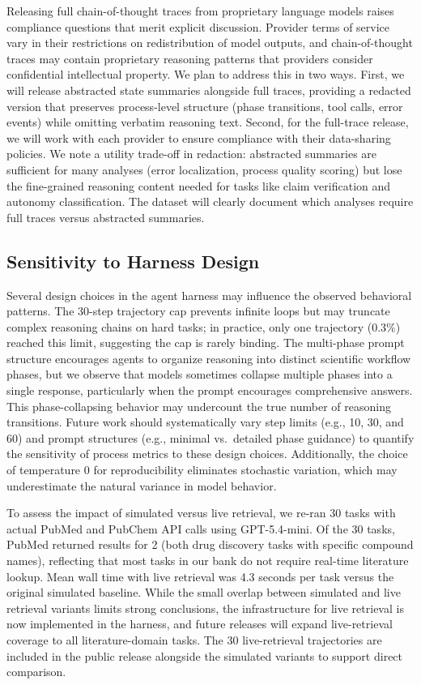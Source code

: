 \documentclass{article}
\begin{document}
Releasing full chain-of-thought traces from proprietary language models raises compliance questions that merit explicit discussion. Provider terms of service vary in their restrictions on redistribution of model outputs, and chain-of-thought traces may contain proprietary reasoning patterns that providers consider confidential intellectual property. We plan to address this in two ways. First, we will release abstracted state summaries alongside full traces, providing a redacted version that preserves process-level structure (phase transitions, tool calls, error events) while omitting verbatim reasoning text. Second, for the full-trace release, we will work with each provider to ensure compliance with their data-sharing policies. We note a utility trade-off in redaction: abstracted summaries are sufficient for many analyses (error localization, process quality scoring) but lose the fine-grained reasoning content needed for tasks like claim verification and autonomy classification. The dataset will clearly document which analyses require full traces versus abstracted summaries.

\subsection{Sensitivity to Harness Design}

Several design choices in the agent harness may influence the observed behavioral patterns. The 30-step trajectory cap prevents infinite loops but may truncate complex reasoning chains on hard tasks; in practice, only one trajectory (0.3\%) reached this limit, suggesting the cap is rarely binding. The multi-phase prompt structure encourages agents to organize reasoning into distinct scientific workflow phases, but we observe that models sometimes collapse multiple phases into a single response, particularly when the prompt encourages comprehensive answers. This phase-collapsing behavior may undercount the true number of reasoning transitions. Future work should systematically vary step limits (e.g., 10, 30, and 60) and prompt structures (e.g., minimal vs.\ detailed phase guidance) to quantify the sensitivity of process metrics to these design choices. Additionally, the choice of temperature 0 for reproducibility eliminates stochastic variation, which may underestimate the natural variance in model behavior.

To assess the impact of simulated versus live retrieval, we re-ran 30 tasks with actual PubMed and PubChem API calls using GPT-5.4-mini. Of the 30 tasks, PubMed returned results for 2 (both drug discovery tasks with specific compound names), reflecting that most tasks in our bank do not require real-time literature lookup. Mean wall time with live retrieval was 4.3 seconds per task versus the original simulated baseline. While the small overlap between simulated and live retrieval variants limits strong conclusions, the infrastructure for live retrieval is now implemented in the harness, and future releases will expand live-retrieval coverage to all literature-domain tasks. The 30 live-retrieval trajectories are included in the public release alongside the simulated variants to support direct comparison.
\end{document}

